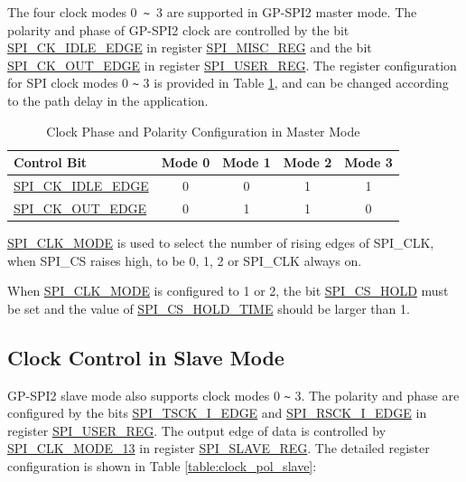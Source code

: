 \documentclass[main\_\_EN.tex]{subfiles}
\begin{document}
The four clock modes 0\verb+ ~ +3 are supported in GP-SPI2 master mode. The polarity and phase of GP-SPI2 clock are controlled by the bit \hyperref[fielddesc:SPICKIDLEEDGE]{SPI\_CK\_IDLE\_EDGE} in register \hyperref[regdesc:SPIMISCREG]{SPI\_MISC\_REG} and the bit \hyperref[fielddesc:SPICKOUTEDGE]{SPI\_CK\_OUT\_EDGE} in register \hyperref[regdesc:SPIUSERREG]{SPI\_USER\_REG}. The register configuration for SPI clock modes 0 \verb+~+ 3 is provided in Table \ref{table:clock_pol_master}, and can be changed according to the path delay in the application.

\begin{table}[H]
    \centering
    \caption{Clock Phase and Polarity Configuration in Master Mode}
    \label{table:clock_pol_master}
    \begin{tabular}[c]{|p{3.5cm}|c|c|c|c|}
    \hline
    \rowcolor{lightgray}
    \textbf{Control Bit} & \textbf{Mode 0} & \textbf{Mode 1} & \textbf{Mode 2} & \textbf{Mode 3}\\
    \hline
    \hyperref[fielddesc:SPICKIDLEEDGE]{SPI\_CK\_IDLE\_EDGE}  & 0     & 0     & 1     & 1\\
    \hline
    \hyperref[fielddesc:SPICKOUTEDGE]{SPI\_CK\_OUT\_EDGE}   & 0     & 1     & 1     & 0\\
    \hline
    \end{tabular}
\end{table}

\hyperref[fielddesc:SPICLKMODE]{SPI\_CLK\_MODE} is used to select the number of rising edges of SPI\_CLK, when SPI\_CS raises high, to be 0, 1, 2 or SPI\_CLK always on.

\begin{tiplisting}
When \hyperref[fielddesc:SPICLKMODE]{SPI\_CLK\_MODE} is configured to 1 or 2, the bit \hyperref[fielddesc:SPICSHOLD]{SPI\_CS\_HOLD} must be set and the value of \hyperref[fielddesc:SPICSHOLDTIME]{SPI\_CS\_HOLD\_TIME} should be larger than 1.
\end{tiplisting}
\vspace{-1em}

\subsection{Clock Control in Slave Mode}\label{GP-SPI2 slave clock control}

GP-SPI2 slave mode also supports clock modes 0 \verb+~+ 3. The polarity and phase are configured by the bits \hyperref[fielddesc:SPITSCKIEDGE]{SPI\_TSCK\_I\_EDGE} and \hyperref[fielddesc:SPIRSCKIEDGE]{SPI\_RSCK\_I\_EDGE} in register \hyperref[regdesc:SPIUSERREG]{SPI\_USER\_REG}. The output edge of data is controlled by \hyperref[fielddesc:SPICLKMODE13]{SPI\_CLK\_MODE\_13} in register \hyperref[regdesc:SPISLAVEREG]{SPI\_SLAVE\_REG}. The detailed register configuration is shown in Table \ref{table:clock_pol_slave}:
\end{document}
